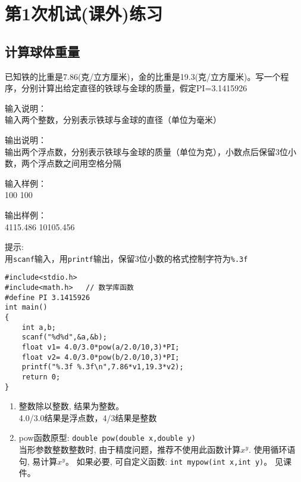 %
%
%
\chapter{第1次机试(课外)练习}

\section{计算球体重量}
已知铁的比重是7.86(克/立方厘米)，金的比重是19.3(克/立方厘米)。写一个程序，分别计算出给定直径的铁球与金球的质量，假定PI=3.1415926

输入说明：\\
输入两个整数，分别表示铁球与金球的直径（单位为毫米）

输出说明：\\
输出两个浮点数，分别表示铁球与金球的质量（单位为克），小数点后保留3位小数，两个浮点数之间用空格分隔

输入样例：\\
100 100

输出样例：\\
4115.486  10105.456

提示: \\
用\lstinline|scanf|输入，用\lstinline|printf|输出，保留3位小数的格式控制字符为\lstinline|%.3f|

\begin{lstlisting}
#include<stdio.h>
#include<math.h>   // 数学库函数 
#define PI 3.1415926       
int main()                   
{  
	int a,b;
	scanf("%d%d",&a,&b);
	float v1= 4.0/3.0*pow(a/2.0/10,3)*PI;
	float v2= 4.0/3.0*pow(b/2.0/10,3)*PI;
	printf("%.3f %.3f\n",7.86*v1,19.3*v2); 
	return 0;           
}                   
\end{lstlisting}

\begin{note}[要点]
	\begin{enumerate}
		\item 整数除以整数, 结果为整数。\\
		4.0/3.0结果是浮点数，4/3结果是整数
		\item pow函数原型: \lstinline|double pow(double x,double y)|\\
		当形参数整数整数时, 由于精度问题，推荐不使用此函数计算$x^y$. 使用循环语句, 易计算$x^y$。 如果必要, 可自定义函数: \lstinline|int mypow(int x,int y)|。 见课件。
	\end{enumerate}
\end{note}

